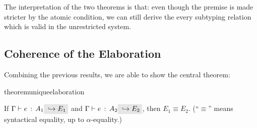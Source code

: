 \noindent The interpretation of the two theorems is that: even though the
premise is made stricter by the atomic condition, we can still derive the every
subtyping relation which is valid in the unrestricted system.

%
%
%
%




\subsection{Coherence of the Elaboration}
Combining the previous results, we are able to show the central theorem:

\begin{restatable}{theorem}{uniqueelaboration}
  \label{theorem:unique-elaboration}

  If $\jtype \Gamma e {A_1} \yields {E_1}$ and $\jtype \Gamma e {A_2} \yields
  {E_2}$, then $E_1 \equiv E_2$. (``$\equiv$'' means syntactical equality, up to
  $\alpha$-equality.)

\end{restatable}

